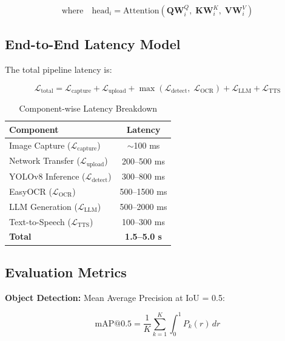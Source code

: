 \begin{equation}
\text{where} \quad \text{head}_i = \text{Attention}(\mathbf{Q}\mathbf{W}_i^Q,\; \mathbf{K}\mathbf{W}_i^K,\; \mathbf{V}\mathbf{W}_i^V)
\end{equation}

\subsection{End-to-End Latency Model}

The total pipeline latency is:

\begin{equation}
\mathcal{L}_{\text{total}} = \mathcal{L}_{\text{capture}} + \mathcal{L}_{\text{upload}} + \max(\mathcal{L}_{\text{detect}},\; \mathcal{L}_{\text{OCR}}) + \mathcal{L}_{\text{LLM}} + \mathcal{L}_{\text{TTS}}
\end{equation}

\begin{table}[h]
\centering
\caption{Component-wise Latency Breakdown}
\begin{tabular}{|l|c|}
\hline
\textbf{Component} & \textbf{Latency} \\
\hline
Image Capture ($\mathcal{L}_{\text{capture}}$)    & $\sim$100 ms \\
Network Transfer ($\mathcal{L}_{\text{upload}}$)  & 200--500 ms \\
YOLOv8 Inference ($\mathcal{L}_{\text{detect}}$)  & 300--800 ms \\
EasyOCR ($\mathcal{L}_{\text{OCR}}$)              & 500--1500 ms \\
LLM Generation ($\mathcal{L}_{\text{LLM}}$)       & 500--2000 ms \\
Text-to-Speech ($\mathcal{L}_{\text{TTS}}$)       & 100--300 ms \\
\hline
\textbf{Total}                                     & \textbf{1.5--5.0 s} \\
\hline
\end{tabular}
\end{table}

\subsection{Evaluation Metrics}

\textbf{Object Detection:} Mean Average Precision at IoU = 0.5:

\begin{equation}
\text{mAP@0.5} = \frac{1}{K} \sum_{k=1}^{K} \int_0^1 P_k(r)\, dr
\end{equation}

